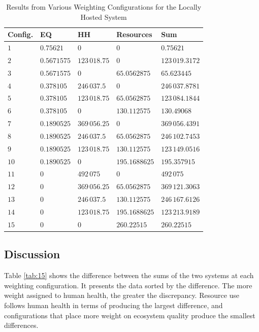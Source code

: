 \documentclass[final,journal,10pt,letterpaper,oneside,twocolumn,compsoc]%
{IEEEtran}
\begin{document}
\begin{table}[t!]
  \caption{Results from Various Weighting Configurations for the Locally Hosted
           System}
  \label{tab:14}
  \centering
    \begin{tabular}{| l | l | l | l | l |}
      \hline
      Config. & EQ & HH & Resources & Sum \\
      \hline
      $1$  & $0.75621$   & $0$          & $0$           & $0.75621$ \\
      $2$  & $0.5671575$ & $123\,018.75$  & $0$           & $123\,019.3172$ \\
      $3$  & $0.5671575$ & $0$          & $65.0562875$  & $65.623445$ \\
      $4$  & $0.378105$  & $246\,037.5$   & $0$           & $246\,037.8781$ \\
      $5$  & $0.378105$  & $123\,018.75$  & $65.0562875$  & $123\,084.1844$ \\
      $6$  & $0.378105$  & $0$          & $130.112575$  & $130.49068$ \\
      $7$  & $0.1890525$ & $369\,056.25$  & $0$           & $369\,056.4391$ \\
      $8$  & $0.1890525$ & $246\,037.5$   & $65.0562875$  & $246\,102.7453$ \\
      $9$  & $0.1890525$ & $123\,018.75$  & $130.112575$  & $123\,149.0516$ \\
      $10$ & $0.1890525$ & $0$          & $195.1688625$ & $195.357915$ \\
      $11$ & $0$         & $492\,075$     & $0$           & $492\,075$ \\
      $12$ & $0$         & $369\,056.25$  & $65.0562875$  & $369\,121.3063$ \\
      $13$ & $0$         & $246\,037.5$   & $130.112575$  & $246\,167.6126$ \\
      $14$ & $0$         & $123\,018.75$  & $195.1688625$ & $123\,213.9189$ \\
      $15$ & $0$         & $0$          & $260.22515$   & $260.22515$ \\
      \hline
    \end{tabular}
\end{table}

\subsection{Discussion}
Table \ref{tab:15} shows the difference between the sums of the two systems at
each
weighting configuration. It presents the data sorted by the difference. The more
weight assigned to human health, the greater the discrepancy. Resource use
follows human health in terms of producing the largest difference, and
configurations that place more weight on ecosystem quality produce the smallest
differences.
\end{document}
